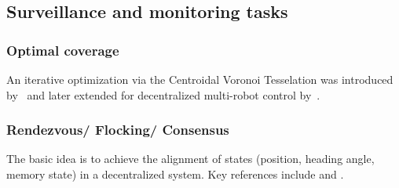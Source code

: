 \subsection{Surveillance and monitoring tasks}

\subsubsection{Optimal coverage}
An iterative optimization via the Centroidal Voronoi Tesselation was introduced by~\cite{cortes04} and later extended for decentralized multi-robot control by~\cite{Schwager:2009fz}.

\subsubsection{Rendezvous/ Flocking/ Consensus} The basic idea is to achieve the alignment of states (position, heading angle, memory state) in a decentralized system. Key references include \cite{Cortes.Martinez.ea:06} and \cite{Jadbabaie.Lin.ea:03}.

